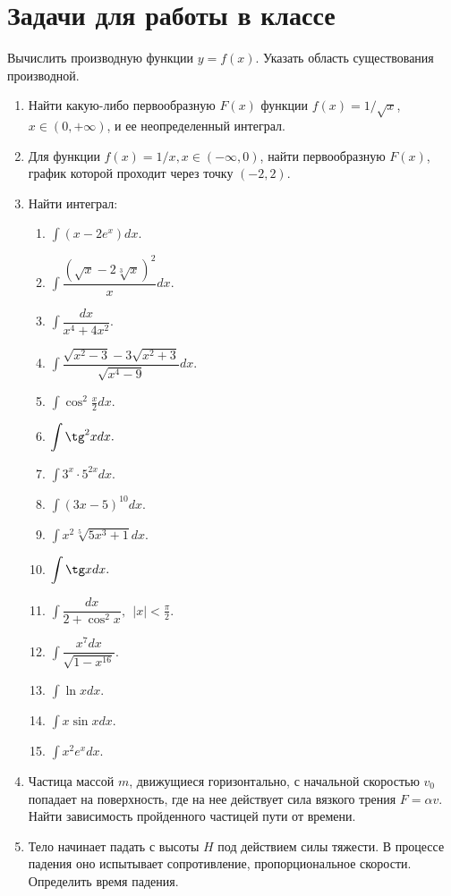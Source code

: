 \documentclass[a4paper,12pt]{article} %
\newcommand{\abs}[1]{\left|#1\right|}
\begin{document}
\section*{Задачи для работы в классе}

Вычислить производную функции $ y=f(x) $. Указать область
существования производной.
\begin{enumerate}[label=\textbf{\arabic*.}]
	\item Найти какую-либо первообразную $ F(x) $ функции
	$ f(x)=1/\sqrt{x} $, $ x\in(0,+\infty) $, и ее
	неопределенный интеграл.
	\item Для функции $ f(x)=1/x, x\in(-\infty, 0) $, найти
	первообразную $ F(x) $, график которой проходит через
	точку $ (-2, 2) $.
	
	\item Найти интеграл:
	\begin{multicols}{3}
		\begin{enumerate}
			\item $ \displaystyle\int(x-2e^x)dx $.
			\item $ \displaystyle\int
			\dfrac{(\sqrt{x}-2\sqrt[3]{x})^2}{x}dx. $
			\item $ \displaystyle\int\dfrac{dx}{x^4+4x^2}. $
			\item $ \displaystyle\int
			\dfrac{\sqrt{x^2-3}-3\sqrt{x^2+3}}{\sqrt{x^4-9}}dx. $
			\item $ \displaystyle\int\cos^2\frac{x}{2}dx. $
			\item $ \displaystyle\int\tg^2xdx. $
			\item $ \displaystyle\int3^x\cdot5^{2x}dx. $
			\item $ \displaystyle\int(3x-5)^{10}dx. $
			\item $ \displaystyle\int x^2\sqrt[5]{5x^3+1}dx. $
			\item $ \displaystyle\int\tg xdx. $
			\item $ \displaystyle\int\dfrac{dx}{2+\cos^2x},
			~~\abs{x}<\frac{\pi}{2}. $
			\item $ \displaystyle\int 
			\dfrac{x^7dx}{\sqrt{1-x^{16}}}. $
			\item $ \displaystyle\int\ln xdx. $
			\item $ \displaystyle\int x\sin xdx. $
			\item $ \displaystyle\int x^2e^xdx. $
		\end{enumerate}
	\end{multicols}
	\item Частица массой $ m $, движущиеся горизонтально, с начальной
	скоростью $ v_0 $ попадает на поверхность, где на нее действует
	сила вязкого трения $ F=\alpha v $.
	Найти зависимость пройденного частицей пути от времени.
	\item Тело начинает падать с высоты $ H $
	под действием силы тяжести. В процессе падения оно
	испытывает сопротивление, пропорциональное скорости.
	Определить время падения.
\end{enumerate}
\end{document}
